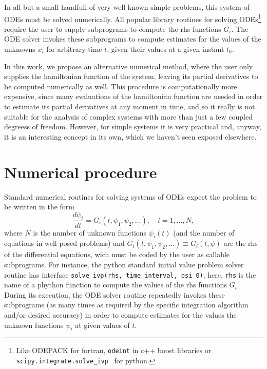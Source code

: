 \documentclass{iopart}
\begin{document}
In all but a small handfull of very well known simple problems, this system of
ODEs must be solved numerically. All popular library routines for solving
ODEs\footnote{Like ODEPACK \cite{odepack} for fortran, \texttt{odeint}
  \cite{odeint} in c++ boost libraries or 
  \texttt{scipy.integrate.solve\_ivp}~\cite{scipy} for python.}
require the user to supply subprograms to compute the rhs functions $G_i$.
The ODE solver invokes these subprograms to compute estimates for the
values of the unknowns $x_i$ for arbitrary time $t$, given their values at a
given instant $t_0$.

In this work, we propose an alternative numerical method, where the user only
supplies the hamiltonian function of the system, leaving its partial derivatives
to be computed numerically as well.  This procedure is computationally more
expensive, since many evaluations of the hamiltonian function are needed in
order to estimate its partial derivatives at any moment in time, and so it
really is not suitable for the analysis of complex systems with more than just a
few coupled degreess of freedom. However, for simple systems it is very
practical and, anyway, it is an interesting concept in its own, which we haven't
seen exposed elsewhere.

\section{Numerical procedure}
Standard numerical routines for solving systems of ODEs expect the problem to be
written in the form
\begin{equation}\label{eq:numheqs}
  \frac{d\psi_i}{dt}=G_i(t, \psi_1, \psi_2, \ldots),\quad i=1, \ldots, N,
\end{equation}
where $N$ is the number of unknown functions $\psi_i(t)$ (and the number of
equations in well posed problems) and $G_i(t, \psi_1, \psi_2, \ldots)\equiv
G_i(t,\psi)$ are the rhs of the differential equations, wich must be coded by
the user as callable subprograms. For instance, the python standard initial
value problem solver routine has interface
\texttt{solve\_ivp(rhs, time\_interval, psi\_0)}; here, \texttt{rhs} is the name
of a phython function to compute the values of the rhs functions $G_i$.
During its execution, the ODE solver routine repeatedly invokes these
subprograms (as many times as required by the specific integration algorithm
and/or desired accuracy) in order to compute estimates for the values the
unknown functions $\psi_i$ at given values of $t$.
\end{document}
